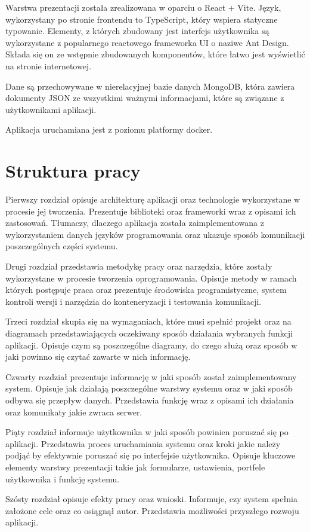 Warstwa prezentacji została zrealizowana w oparciu o React + Vite. Język, wykorzystany po stronie frontendu to TypeScript, który wspiera statyczne typowanie.  Elementy, z których zbudowany jest interfejs użytkownika są wykorzystane z popularnego reactowego frameworka UI o naziwe Ant Design. Składa się on ze wstępnie zbudowanych komponentów, które łatwo jest wyświetlić na stronie internetowej.

Dane są przechowywane w nierelacyjnej bazie danych MongoDB, która zawiera dokumenty JSON ze wszystkimi ważnymi informacjami, które są związane z użytkownikami aplikacji.

Aplikacja uruchamiana jest z poziomu platformy docker.
\section{Struktura pracy}
Pierwszy rozdział opisuje architekturę aplikacji oraz technologie wykorzystane w procesie jej tworzenia. Prezentuje biblioteki oraz frameworki wraz z opisami ich zastosowań. Tłumaczy, dlaczego aplikacja została zaimplementowana z wykorzystaniem danych języków programowania oraz ukazuje sposób komunikacji poszczególnych części systemu.

Drugi rozdział przedstawia metodykę pracy oraz narzędzia, które zostały wykorzystane w procesie tworzenia oprogramowania. Opisuje metody w ramach których postępuje praca oraz prezentuje środowiska programistyczne, system kontroli wersji i narzędzia do konteneryzacji i testowania komunikacji. 

Trzeci rozdział skupia się na wymaganiach, które musi spełnić projekt oraz na diagramach przedstawiających oczekiwany sposób działania wybranych funkcji aplikacji. Opisuje czym są poszczególne diagramy, do czego służą oraz sposób w jaki powinno się czytać zawarte w nich informację. 

Czwarty rozdział prezentuje informację w jaki sposób został zaimplementowany system. Opisuje jak działają poszczególne warstwy systemu oraz w jaki sposób odbywa się przepływ danych. Przedstawia funkcję wraz z opisami ich działania oraz komunikaty jakie zwraca serwer. 

Piąty rozdział informuje użytkownika w jaki sposób powinien poruszać się po aplikacji.
Przedstawia proces uruchamiania systemu oraz kroki jakie należy podjąć by efektywnie poruszać się po interfejsie użytkownika. Opisuje kluczowe elementy warstwy prezentacji takie jak formularze, ustawienia, portfele użytkownika i funkcję systemu.

Szósty rozdział opisuje efekty pracy oraz wnioski. Informuje, czy system spełnia założone cele oraz co osiągnął autor. Przedstawia możliwości przyszłego rozwoju aplikacji.